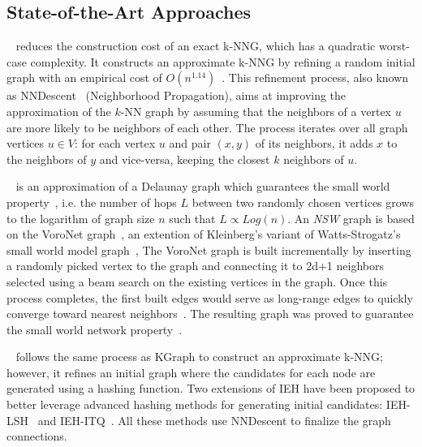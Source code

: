 \subsection{State-of-the-Art Approaches}
~\cite{kgraph} reduces the construction cost of an exact k-NNG, which has a quadratic worst-case complexity. It constructs an approximate k-NNG by refining a random initial graph with an empirical cost of \( O\left(n^{1.14}\right) \)~\cite{nndescent}. 
This refinement process, also known as NNDescent~\cite{nndescent} (Neighborhood Propagation), aims at improving the approximation of the \( k \)-NN graph by assuming that the neighbors of a vertex \( u \) are more likely to be neighbors of each other. 
The process iterates over all graph vertices \( u \in {V} \): 
for each vertex \( u \) and pair \( (x,y) \) of its neighbors, it adds \( x \) to the neighbors of \( y \) and vice-versa, keeping the closest \( k \) neighbors of \( u \).

 ~\cite{nsw11,nsw14} is an approximation of a Delaunay graph which guarantees the small world property~\cite{watts98}, i.e. the number of hops $L$ between two randomly chosen vertices grows to the logarithm of graph size $n$ such that $L \propto Log\left(n\right)$.
An {\it NSW} graph is based on the VoroNet graph~\cite{voronet}, an extention of Kleinberg's variant of Watts-Strogatz's small world model graph~\cite{kleinberg2000,kleinberg2002},  The VoroNet graph is built incrementally by inserting a randomly picked vertex to the graph and connecting it to 2d+1 
neighbors selected using a beam search on the existing vertices in the graph.
Once this process completes, the first built edges would serve as long-range edges to quickly converge toward nearest neighbors~\cite{voronet}. The resulting graph was proved to guarantee the small world network property~\cite{voronet,beaumont07}. 

 ~\cite{ieh} follows the same process as KGraph to construct an approximate k-NNG; however, it refines an initial graph where the candidates for each node are generated using a hashing function.
Two extensions of IEH have been proposed to better leverage advanced hashing methods for generating initial candidates: IEH-LSH~\cite{iehlsh} and IEH-ITQ~\cite{iehitq}. All these methods use NNDescent to finalize the graph connections.

